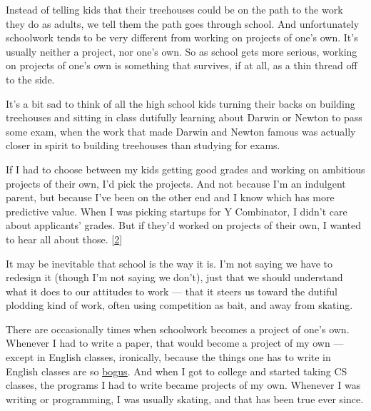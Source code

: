Instead of telling kids that their treehouses
                  could be on the path to the work they do as adults, we tell
                  them the path goes through school. And unfortunately
                  schoolwork tends to be very different from working on projects
                  of one's own. It's usually neither a project, nor one's own.
                  So as school gets more serious, working on projects of one's
                  own is something that survives, if at all, as a thin thread
                  off to the side.

It's a bit sad to think of all the
                  high school kids turning their backs on building treehouses
                  and sitting in class dutifully learning about Darwin or Newton
                  to pass some exam, when the work that made Darwin and Newton
                  famous was actually closer in spirit to building treehouses
                  than studying for exams.

If I had to choose between
                  my kids getting good grades and working on ambitious projects
                  of their own, I'd pick the projects. And not because I'm an
                  indulgent parent, but because I've been on the other end and I
                  know which has more predictive value. When I was picking
                  startups for Y Combinator, I didn't care about applicants'
                  grades. But if they'd worked on projects of their own, I
                  wanted to hear all about those.
                  [\href{\#f2n}{2}]

It may be inevitable that school is the way it
                  is. I'm not saying we have to redesign it (though I'm not
                  saying we don't), just that we should understand what it does
                  to our attitudes to work --- that it steers us toward the
                  dutiful plodding kind of work, often using competition as
                  bait, and away from skating.

There are occasionally
                  times when schoolwork becomes a project of one's own. Whenever
                  I had to write a paper, that would become a project of my own
                  --- except in English classes, ironically, because the
                  things one has to write in English classes are so
                  \href{http://www.paulgraham.com/essay.html}{\underline{bogus}}. And when I got to college and started taking CS classes,
                  the programs I had to write became projects of my own.
                  Whenever I was writing or programming, I was usually skating,
                  and that has been true ever since.

